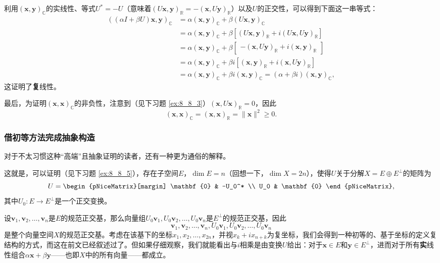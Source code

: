 利用$(\mathbf{x},\mathbf{y})_{\mathbb{C}}$的实线性、等式$U^* = -U$（意味着$(U\mathbf{x},\mathbf{y})_{\mathbb{R}} =$\linebreak$ -(\mathbf{x},U\mathbf{y})_{\mathbb{R}}$）以及$U$的正交性，可以得到下面这一串等式：
\[
\begin{aligned}\left((\alpha I+\beta U)\mathbf{x},\mathbf{y}\right)_{\mathbb{C}}&=\alpha(\mathbf{x},\mathbf{y})_{\mathbb{C}}+\beta(U\mathbf{x},\mathbf{y})_{\mathbb{C}}\\&=\alpha(\mathbf{x},\mathbf{y})_{\mathbb{C}}+\beta\left[(U\mathbf{x},\mathbf{y})_{\mathbb{R}}+i(U\mathbf{x},U\mathbf{y})_{\mathbb{R}}\right]\\&=\alpha(\mathbf{x},\mathbf{y})_{\mathbb{C}}+\beta\begin{bmatrix}-(\mathbf{x},U\mathbf{y})_{\mathbb{R}}+i(\mathbf{x},\mathbf{y})_{\mathbb{R}}\end{bmatrix}\\&=\alpha(\mathbf{x},\mathbf{y})_{\mathbb{C}}+\beta i\left[(\mathbf{x},\mathbf{y})_{\mathbb{R}}+i(\mathbf{x},U\mathbf{y})_{\mathbb{R}}\right]\\&=\alpha(\mathbf{x},\mathbf{y})_\mathbb{C}+\beta i(\mathbf{x},\mathbf{y})_\mathbb{C}=(\alpha+\beta i)(\mathbf{x},\mathbf{y})_\mathbb{C},\end{aligned}
\]
这证明了\textbf{复}线性。

最后，为证明$(\mathbf{x},\mathbf{x})_\mathbb{C}$的非负性，注意到（见下习题 \ref{ex:8_8_3}）$(\mathbf{x},U\mathbf{x})_\mathbb{R}=0$，因此
\[(\mathbf{x},\mathbf{x})_\mathbb{C} = (\mathbf{x},\mathbf{x})_\mathbb{R} = \|\mathbf{x}\|^2\ge 0.\]

\subsubsection{借初等方法完成抽象构造}

对于不太习惯这种“高端”且抽象证明的读者，还有一种更为通俗的解释。

这就是，可以证明（见下习题 \ref{ex:8_8_5}），存在子空间$E$，$\dim E=n$（回想一下，$\dim X = 2n$），使得$U$关于分解$X = E\oplus E^\perp$的矩阵为
\[U = \begin{pNiceMatrix}[margin]
    \mathbf{0} & -U_0^* \\ U_0 & \mathbf{0}
\end{pNiceMatrix},\]
其中$U_0:E\to E^\perp$是一个正交变换。

设$\mathbf{v}_1,\mathbf{v}_2,\ldots,\mathbf{v}_n$是$E$的规范正交基，那么向量组$U_0\mathbf{v}_1,$\linebreak$U_0\mathbf{v}_2,\ldots,U_0\mathbf{v}_n$是$E^\perp$的规范正交基，因此
\[\mathbf{v}_1,\mathbf{v}_2,\ldots,\mathbf{v}_n,U_0\mathbf{v}_1,U_0\mathbf{v}_2,\ldots,U_0\mathbf{v}_n\]
是整个向量空间$X$的规范正交基。考虑在该基下的坐标$x_1,x_2,\dots,x_{2n}$，并视$x_k+ix_{n+k}$为复坐标，我们会得到一种初等的、基于坐标的定义复结构的方式，而这在前文已经叙述过了。但如果仔细观察，我们就能看出与$i$相乘是由变换$U$给出：对于$\mathbf{x}\in E$和$\mathbf{y}\in E^\perp$，进而对于所有\textbf{实}线性组合$\alpha\mathbf{x}+\beta\mathbf{y}$——也即$X$中的所有向量——都成立。

